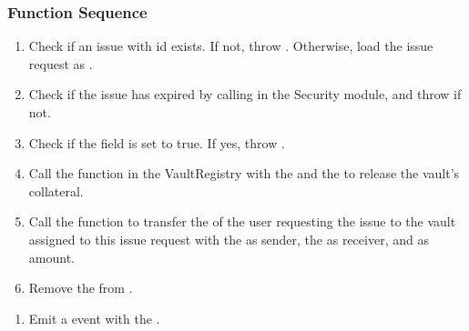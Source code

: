 \documentclass[a4paper,10pt,english]{sphinxmanual}
\begin{document}
\subsubsection{Function Sequence}
\label{\detokenize{spec/issue:id11}}\begin{enumerate}
%
\item {} 
Check if an issue with id  exists. If not, throw . Otherwise, load the issue request  as .

\item {} 
Check if the issue has expired by calling {\hyperref[\detokenize{spec/security:hasexpired}]{}} in the Security module, and throw  if not.

\item {} 
Check if the  field is set to true. If yes, throw .

\item {} 
Call the {\hyperref[\detokenize{spec/vault-registry:decreasetobeissuedtokens}]{}} function in the VaultRegistry with the  and the  to release the vault’s collateral.

\item {} 
Call the {\hyperref[\detokenize{spec/collateral:slashcollateral}]{}} function to transfer the  of the user requesting the issue to the vault assigned to this issue request with the  as sender, the  as receiver, and  as amount.

\item {} 
Remove the  from .

\end{enumerate}
\begin{enumerate}
%
\setcounter{enumi}{7}
\item {} 
Emit a  event with the .

\end{enumerate}
\end{document}
